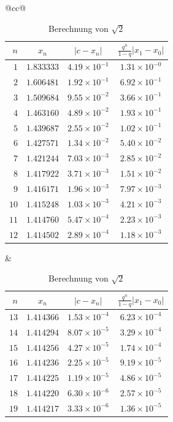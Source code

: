 \documentclass[
  a4paper, 10pt, fleqn, twoside, twocolumn,
  abstract=true
]{scrartcl}
\theoremstyle{plain}
\theoremstyle{definition}
\begin{document}
\begin{table}
\begin{center}
\caption{Berechnung von $\sqrt{2}$}\label{tab:Berechnung}
\begin{tabular}{@{}cc@{}}
\begin{tabular}{rccc}
\toprule
$n$ & $x_n$ & $|c-x_n|$ & $\frac{q^n}{1-q}|x_1-x_0|$\\
\midrule
$ 1$ & $1.833333$ & $4.19\times 10^{-1}$ & $1.31\times 10^{-0}$\\
$ 2$ & $1.606481$ & $1.92\times 10^{-1}$ & $6.92\times 10^{-1}$\\
$ 3$ & $1.509684$ & $9.55\times 10^{-2}$ & $3.66\times 10^{-1}$\\
$ 4$ & $1.463160$ & $4.89\times 10^{-2}$ & $1.93\times 10^{-1}$\\
\midrule
$ 5$ & $1.439687$ & $2.55\times 10^{-2}$ & $1.02\times 10^{-1}$\\
$ 6$ & $1.427571$ & $1.34\times 10^{-2}$ & $5.40\times 10^{-2}$\\
$ 7$ & $1.421244$ & $7.03\times 10^{-3}$ & $2.85\times 10^{-2}$\\
$ 8$ & $1.417922$ & $3.71\times 10^{-3}$ & $1.51\times 10^{-2}$\\
\midrule
$ 9$ & $1.416171$ & $1.96\times 10^{-3}$ & $7.97\times 10^{-3}$\\
$10$ & $1.415248$ & $1.03\times 10^{-3}$ & $4.21\times 10^{-3}$\\
$11$ & $1.414760$ & $5.47\times 10^{-4}$ & $2.23\times 10^{-3}$\\
$12$ & $1.414502$ & $2.89\times 10^{-4}$ & $1.18\times 10^{-3}$\\
\bottomrule
\end{tabular}
&
\begin{tabular}{rccc}
\toprule
$n$ & $x_n$ & $|c-x_n|$ & $\frac{q^n}{1-q}|x_1-x_0|$\\
\midrule
$13$ & $1.414366$ & $1.53\times 10^{-4}$ & $6.23\times 10^{-4}$\\
$14$ & $1.414294$ & $8.07\times 10^{-5}$ & $3.29\times 10^{-4}$\\
$15$ & $1.414256$ & $4.27\times 10^{-5}$ & $1.74\times 10^{-4}$\\
$16$ & $1.414236$ & $2.25\times 10^{-5}$ & $9.19\times 10^{-5}$\\
\midrule
$17$ & $1.414225$ & $1.19\times 10^{-5}$ & $4.86\times 10^{-5}$\\
$18$ & $1.414220$ & $6.30\times 10^{-6}$ & $2.57\times 10^{-5}$\\
$19$ & $1.414217$ & $3.33\times 10^{-6}$ & $1.36\times 10^{-5}$\\

\end{tabular}
\end{tabular}
\end{center}
\end{table}
\end{document}
